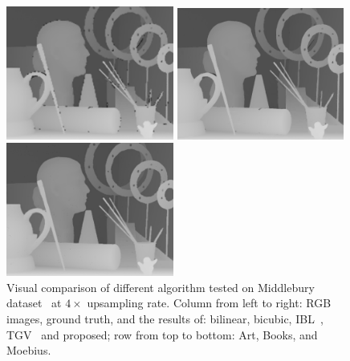 \begin{figure}[t]
\begin{minipage}[b]{0.48\linewidth}
\end{minipage}
\hfill
\begin{minipage}[b]{0.48\linewidth}
  \centering
  \centerline{\includegraphics[width=5.5cm]{depth_interp/quan_nhf/yang.png}}
\end{minipage}
%
\vfill
\begin{minipage}[b]{0.48\linewidth}
  \centering
  \centerline{\includegraphics[width=5.5cm]{depth_interp/quan_nhf/tgv.png}}
\end{minipage}
%
\hfill
\begin{minipage}[b]{0.48\linewidth}
  \centering
  \centerline{\includegraphics[width=5.5cm]{depth_interp/quan_nhf/our.png}}
\end{minipage}
\vfill
\label{fig2:art}
\caption{Visual comparison of different algorithm tested on Middlebury dataset~\cite{scharstein2003high} at $4\times$ upsampling rate. Column from left to right: RGB images, ground truth, and the results of: bilinear, bicubic, IBL~\cite{yang2014color}, TGV~\cite{ferstl2013image} and proposed; row from top to bottom: Art, Books, and Moebius.}
\end{figure}

